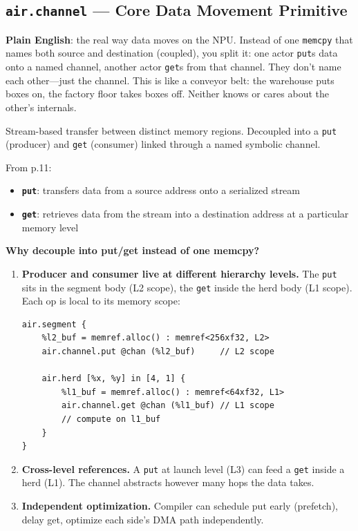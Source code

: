 \documentclass[11pt,a4paper]{article}
\begin{document}
\subsection{\texttt{air.channel} --- Core Data Movement Primitive}

\textbf{Plain English}: the real way data moves on the NPU. Instead of one
\texttt{memcpy} that names both source and destination (coupled), you split it:
one actor \texttt{put}s data onto a named channel, another actor \texttt{get}s
from that channel. They don't name each other---just the channel. This is like a
conveyor belt: the warehouse puts boxes on, the factory floor takes boxes off.
Neither knows or cares about the other's internals.

Stream-based transfer between distinct memory regions. Decoupled into a \texttt{put}
(producer) and \texttt{get} (consumer) linked through a named symbolic channel.

From p.11:
\begin{itemize}[leftmargin=2em]
  \item \textbf{\texttt{put}}: transfers data from a source address onto a serialized
    stream
  \item \textbf{\texttt{get}}: retrieves data from the stream into a destination
    address at a particular memory level
\end{itemize}

\textbf{Why decouple into put/get instead of one memcpy?}

\begin{enumerate}[leftmargin=2em]
  \item \textbf{Producer and consumer live at different hierarchy levels.}
    The \texttt{put} sits in the segment body (L2 scope), the \texttt{get} inside the
    herd body (L1 scope). Each op is local to its memory scope:
\begin{lstlisting}
air.segment {
    %l2_buf = memref.alloc() : memref<256xf32, L2>
    air.channel.put @chan (%l2_buf)     // L2 scope

    air.herd [%x, %y] in [4, 1] {
        %l1_buf = memref.alloc() : memref<64xf32, L1>
        air.channel.get @chan (%l1_buf) // L1 scope
        // compute on l1_buf
    }
}
\end{lstlisting}

  \item \textbf{Cross-level references.} A \texttt{put} at launch level (L3) can
    feed a \texttt{get} inside a herd (L1). The channel abstracts however many hops
    the data takes.

  \item \textbf{Independent optimization.} Compiler can schedule put early
    (prefetch), delay get, optimize each side's DMA path independently.
\end{enumerate}
\end{document}
